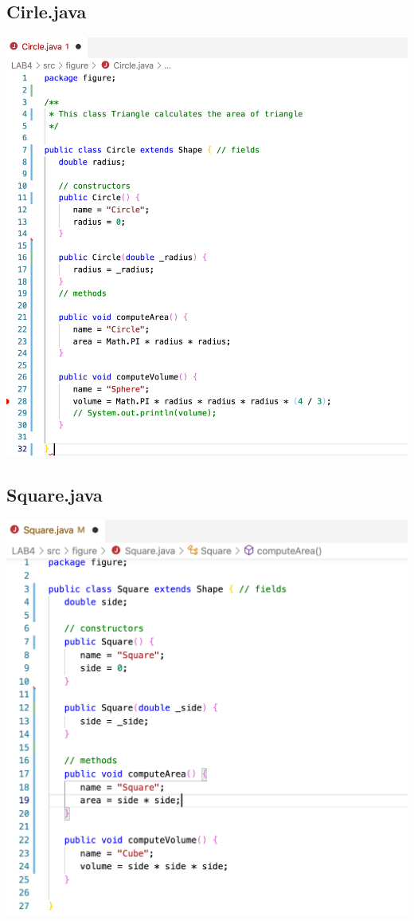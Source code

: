 \documentclass[hidelinks,12pt]{article}
\begin{document}
    \subsection{Cirle.java}
    \includegraphics[scale=0.4]{z_circle.png}
    
    
    \subsection{Square.java}
    \includegraphics[scale=0.4]{z_square.png}
    
\end{document}
